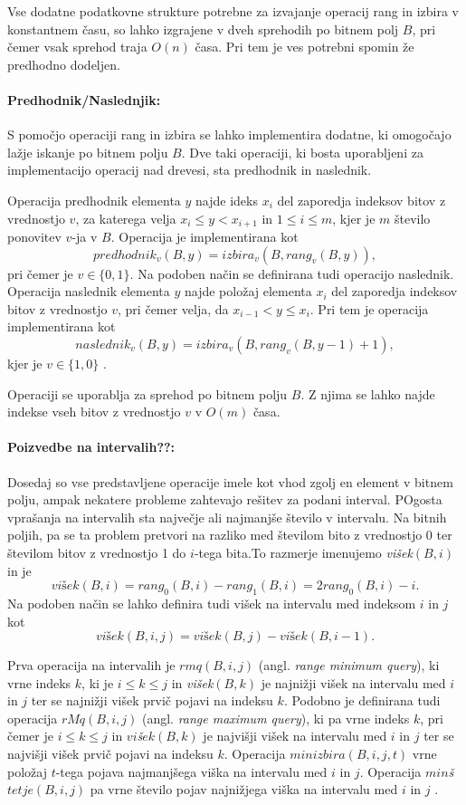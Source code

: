 Vse dodatne podatkovne strukture potrebne za izvajanje operacij rang in izbira v konstantnem času, so lahko izgrajene v dveh sprehodih po bitnem polj $B$, pri čemer vsak sprehod traja $O(n)$ časa. Pri tem je ves potrebni spomin že predhodno dodeljen.

\paragraph{Predhodnik/Naslednjik:}
S pomočjo operaciji rang in izbira se lahko implementira dodatne, ki omogočajo lažje iskanje po bitnem polju $B$. Dve taki operaciji, ki bosta uporabljeni za implementacijo operacij nad drevesi, sta predhodnik in naslednik.

Operacija predhodnik elementa $y$ najde ideks $x_i$ del zaporedja indeksov bitov z vrednostjo $v$, za katerega velja $x_i \le y < x_{i+1}$ in $1\le i\le m$, kjer je $m$ število ponovitev $v$-ja v $B$. Operacija je implementirana kot
    $$predhodnik_v(B,y)=izbira_v(B,rang_v(B,y)),$$
pri čemer je $v\in \{0,1\}$. Na podoben način se definirana tudi operacijo naslednik. Operacija naslednik elementa $y$ najde položaj elementa $x_i$ del zaporedja indeksov bitov z vrednostjo $v$, pri čemer velja, da $x_{i-1}< y \le x_i$. Pri tem je operacija implementirana kot
    $$naslednik_v(B,y)=izbira_v(B,rang_v(B,y-1)+1),$$
kjer je  $v\in \{1,0\}$ \cite{Navarro2016}.

Operaciji se uporablja za sprehod po bitnem polju $B$. Z njima se lahko najde indekse vseh bitov z vrednostjo $v$ v $O(m)$ časa.

\paragraph{Poizvedbe na intervalih??:}
Dosedaj so vse predstavljene operacije imele kot vhod zgolj en element v bitnem polju, ampak nekatere probleme zahtevajo rešitev za podani interval. POgosta vprašanja na intervalih sta največje ali najmanjše število v intervalu. Na bitnih poljih, pa se ta problem pretvori na razliko med številom bito z vrednostjo 0 ter številom bitov z vrednostjo 1 do $i$-tega bita.To razmerje imenujemo \textit{višek}$(B,i)$ in je
$$
    \textit{višek}(B,i)=rang_0(B,i)-rang_1(B,i)=2rang_0(B,i)-i.
$$
Na podoben način se lahko definira tudi višek na intervalu med indeksom $i$ in $j$ kot
$$
    \textit{višek}(B,i,j)=\textit{višek}(B,j)-\textit{višek}(B,i-1).
$$

Prva operacija na intervalih je $rmq(B,i,j)$ (angl. \textit{range minimum query}), ki vrne indeks $k$, ki je $i\le k\le j$ in \textit{višek}$(B,k)$ je najnižji višek na intervalu med $i$ in $j$ ter se najnižji višek prvič pojavi na indeksu $k$. Podobno je definirana tudi operacija $rMq(B,i,j)$ (angl. \textit{range maximum query}), ki pa vrne indeks $k$, pri čemer je $i\le k\le j$ in $vi$\textit{š}$ek(B,k)$ je najvišji višek na intervalu med $i$ in $j$ ter se najvišji višek prvič pojavi na indeksu $k$. Operacija $minizbira(B,i,j,t)$ vrne položaj $t$-tega pojava najmanjšega viška na intervalu med $i$ in $j$. Operacija $min$\textit{š}$tetje(B,i,j)$ pa vrne število pojav najnižjega viška na intervalu med $i$ in $j$ \cite{Navarro2016}.

